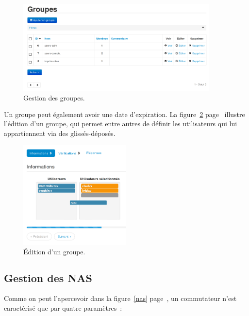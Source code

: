 \begin{figure}[!h]
	\begin{center}
	    \includegraphics[width=0.9\textwidth]{img/groupes.png}
	\end{center}
	\caption{Gestion des groupes.}
	\label{groupes}
\end{figure}

Un groupe peut également avoir une date d'expiration. La figure~\ref{groupesedit} page~\pageref{groupesedit} illustre l'édition d'un groupe, qui permet entre autres de définir les utilisateurs qui lui appartiennent via des glissés-déposés.

\begin{figure}[!h]
	\begin{center}
	    \includegraphics[width=0.5\textwidth]{img/groupesedit.png}
	\end{center}
	\caption{Édition d'un groupe.}
	\label{groupesedit}
\end{figure}

\subsection{Gestion des NAS}

Comme on peut l'apercevoir dans la figure~\ref{nas} page~\pageref{nas}, un commutateur n'est caractérisé que par quatre paramètres~:

